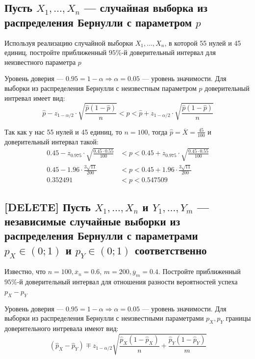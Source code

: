 \documentclass{article}
\begin{document}
\subsection{Пусть $X_{1}, \ldots, X_{n}$ — случайная выборка из распределения Бернулли с параметром $p$}
Используя реализацию случайной выборки $X_{1}, \ldots, X_{n}$, в которой 55 нулей и 45 единиц, постройте приближенный $95 \%$-й доверительный интервал для неизвестного параметра $p$

Уровень доверия — $0.95=1-\alpha\Longrightarrow\alpha=0.05$ — уровень значимости. Для выборки из распределения Бернулли с неизвестным параметром $p$ доверительный интревал имеет вид:
\begin{equation*}
    \widehat{p}-z_{1-\alpha/2}\cdot\sqrt{\frac{\widehat{p}(1-\widehat{p})}{n}}<p<\widehat{p}+z_{1-\alpha/2}\cdot\sqrt{\frac{\widehat{p}(1-\widehat{p})}{n}}
\end{equation*}

Так как у нас 55 нулей и 45 единиц, то $n=100$, тогда $\widehat{p}=\overline{X}=\frac{45}{100}$ и доверительный интервал такой:
\begin{equation*}
    \begin{aligned}
        0.45-z_{0.975}\cdot\sqrt{\frac{0.45\cdot0.55}{100}}&<p<0.45+z_{0.975}\cdot\sqrt{\frac{0.45\cdot0.55}{100}}\\
        0.45-1.96\cdot\frac{3\sqrt{11}}{200}&<p<0.45+1.96\cdot\frac{3\sqrt{11}}{200}\\
        0.352491&<p<0.547509
    \end{aligned}
\end{equation*}

\subsection{[DELETE] Пусть $X_{1}, \ldots, X_{n}$ и $Y_{1}, \ldots, Y_{m}$ — независимые случайные выборки из распределения Бернулли с параметрами $p_{X} \in(0 ; 1)$ и $p_{Y} \in(0 ; 1)$ соответственно}
Известно, что $n=100, \overline{x}_{n}=0.6$, $m=200, \overline{y}_{m}=0.4$. Постройте приближенный $95 \%$-й доверительный интервал для отношения разности вероятностей успеха $p_{X}-p_{Y}$

Уровень доверия — $0.95=1-\alpha\Longrightarrow\alpha=0.05$ — уровень значимости. Для выборки из распределения Бернулли с неизвестными параметрами $p_X,p_Y$ границы доверительного интревала имеют вид:
\begin{equation*}
    \left(\widehat{p}_X-\widehat{p}_Y\right)\mp z_{1-\alpha/2}\sqrt{\frac{\widehat{p}_X(1-\widehat{p}_X)}{n}+\frac{\widehat{p}_Y(1-\widehat{p}_Y)}{m}}
\end{equation*}
\end{document}
